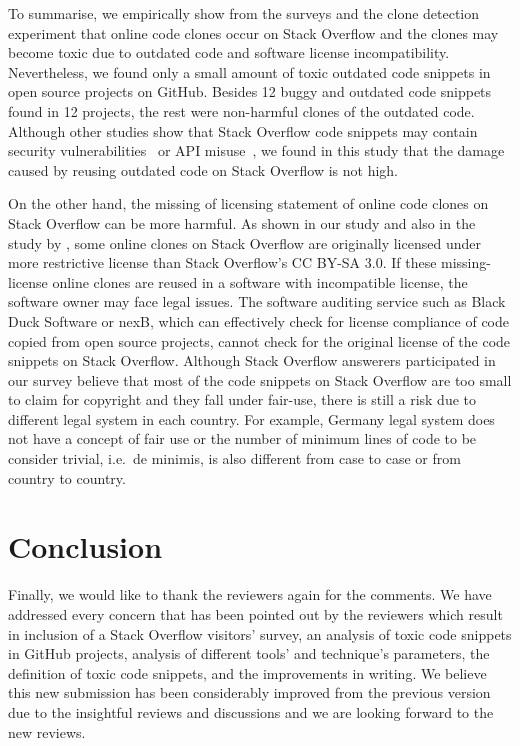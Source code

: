 \documentclass[a4paper,twoside,10pt]{reviewresponse}
\begin{document}
To summarise, we empirically show from the surveys and the clone detection experiment that online code clones occur on Stack Overflow and the clones may become toxic due to outdated code and software license incompatibility. 
Nevertheless, we found only a small amount of toxic outdated code snippets in open source projects on GitHub. Besides 12 buggy and outdated code snippets found in 12 projects, the rest were non-harmful clones of the outdated code. Although other studies show that Stack Overflow code snippets may contain security vulnerabilities~\citep{Acar2016,Fischer2017} or API misuse~\citep{Zhang2018}, we found in this study that the damage caused by reusing outdated code on Stack Overflow is not high. 

On the other hand, the missing of licensing statement of online code clones on Stack Overflow can be more harmful. As shown in our study and also in the study by \cite{An2017}, some online clones on Stack Overflow are originally licensed under more restrictive license than Stack Overflow's CC BY-SA 3.0. If these missing-license online clones are reused in a software with incompatible license, the software owner may face legal issues. The software auditing service such as Black Duck Software or nexB, which can effectively check for license compliance of code copied from open source projects, cannot check for the original license of the code snippets on Stack Overflow. Although Stack Overflow answerers participated in our survey believe that most of the code snippets on Stack Overflow are too small to claim for copyright and they fall under fair-use, there is still a risk due to different legal system in each country. For example, Germany legal system does not have a concept of fair use or the number of minimum lines of code to be consider trivial, i.e.~de minimis, is also different from case to case or from country to country. 

\vspace{1cm}

\section{Conclusion}
Finally, we would like to thank the reviewers again for the comments.
We have addressed every concern that has been pointed out by the reviewers which result in inclusion of a Stack Overflow visitors' survey, an analysis of toxic code snippets in GitHub projects, analysis of different tools' and technique's parameters, the definition of toxic code snippets, and the improvements in writing.
We believe this new submission has been considerably improved from the previous version due to the insightful reviews and discussions and we are looking forward to the new reviews.

%


\end{document}
